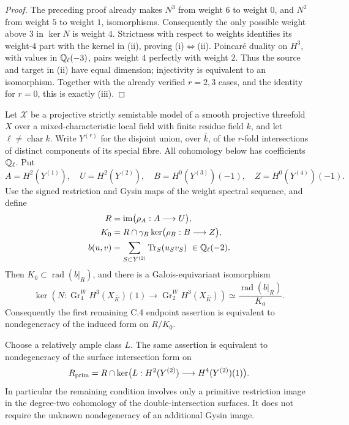 \begin{proof}
The preceding proof already makes $N^3$ from weight $6$ to weight
$0$, and $N^2$ from weight $5$ to weight $1$, isomorphisms.
Consequently the only possible weight above $3$ in $\ker N$ is
weight $4$.  Strictness with respect to weights identifies its
weight-$4$ part with the kernel in (ii), proving (i)$\Leftrightarrow$(ii).
Poincar\'e duality on $H^3$, with values in $\mathbb Q_\ell(-3)$, pairs
weight $4$ perfectly with weight $2$.  Thus the source and target
in (ii) have equal dimension; injectivity is equivalent to an
isomorphism.  Together with the already verified $r=2,3$ cases,
and the identity for $r=0$, this is exactly (iii).
\end{proof}


\begin{proposition}
\label{c:threefold-pairing-kernel}
Let $\mathcal X$ be a projective strictly semistable model of a smooth
projective threefold $X$ over a mixed-characteristic local field with
finite residue field $k$, and let $\ell\ne\operatorname{char}k$.
Write $Y^{(r)}$ for the disjoint union, over $\bar k$, of the
$r$-fold intersections of distinct components of its special fibre.
All cohomology below has coefficients $\mathbb Q_\ell$.  Put
\[
 A=H^2(Y^{(1)}),\quad U=H^2(Y^{(2)}),\quad
 B=H^0(Y^{(3)})(-1),\quad Z=H^0(Y^{(4)})(-1).
\]
Use the signed restriction and Gysin maps of the weight spectral
sequence, and define
\[
 \begin{split}
 R&=\operatorname{im}\bigl(\rho_A:A\longrightarrow U\bigr),\\
 K_0&=R\cap\gamma_B
       \ker\bigl(\rho_B:B\longrightarrow Z\bigr),\\
 b(u,v)&=\sum_{S\subset Y^{(2)}}\operatorname{Tr}_S(u_Sv_S)
           \ \in\mathbb Q_\ell(-2).
 \end{split}
\]
Then $K_0\subset\operatorname{rad}(b|_R)$, and there is a
Galois-equivariant isomorphism
\begin{equation}
\label{eq:c-threefold-radical-kernel}
 \ker\!\left(
 N:\operatorname{Gr}^W_4H^3(X_{\bar K})(1)
       \longrightarrow\operatorname{Gr}^W_2H^3(X_{\bar K})
 \right)
 \simeq
 \frac{\operatorname{rad}(b|_R)}{K_0}.
\end{equation}
Consequently the first remaining C.4 endpoint assertion is equivalent
to nondegeneracy of the induced form on $R/K_0$.

Choose a relatively ample class $L$.  The same assertion is
equivalent to nondegeneracy of the surface intersection form on
\begin{equation}
\label{eq:c-threefold-primitive-image}
 R_{\rm prim}
 =R\cap
   \ker\bigl(
       L:H^2(Y^{(2)})\longrightarrow H^4(Y^{(2)})(1)
       \bigr).
\end{equation}
In particular the remaining condition involves only a primitive
restriction image in the degree-two cohomology of the
double-intersection surfaces.  It does not require the unknown
nondegeneracy of an additional Gysin image.
\end{proposition}

